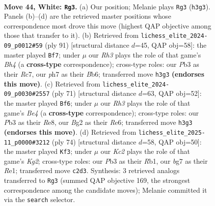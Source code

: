 \documentclass[11pt]{article}
\begin{document}
\clearpage

\begin{figure}[p]\centering
\begin{subfigure}{0.46\textwidth}\centering
\resizebox{\linewidth}{!}{%
\newchessgame
\chessboard[
  setfen={1rr5/1n4bp/p2p2k1/P3p1Pp/1pP1P3/1P3P1R/2K3B1/R3B3 w - - 2 44},
  showmover=false,
  pgfstyle=straightmove, color=movearrow, markmove={h3-g3}
]}
\caption{}
\end{subfigure}\hfill
\begin{subfigure}{0.46\textwidth}\centering
\resizebox{\linewidth}{!}{%
\newchessgame
\chessboard[
  setfen={8/2r3pk/1bp1Bp2/p3pPpb/1r2P3/1P1P2KP/R1R1N1P1/8 b - - 9 46},
  showmover=false,
  pgfstyle=straightmove, color=movearrow, markmove={h5-f7}
]}
\caption{}
\end{subfigure}
\\[4pt]
\begin{subfigure}{0.46\textwidth}\centering
\resizebox{\linewidth}{!}{%
\newchessgame
\chessboard[
  setfen={4r3/3R2pk/2p1r3/p1B1bp2/P3p1p1/2P3P1/1P1R1PB1/6K1 b - - 1 36},
  showmover=false,
  pgfstyle=straightmove, color=movearrow, markmove={e5-f6}
]}
\caption{}
\end{subfigure}\hfill
\begin{subfigure}{0.46\textwidth}\centering
\resizebox{\linewidth}{!}{%
\newchessgame
\chessboard[
  setfen={8/1r1r2p1/p2bkp1p/4p2P/PPp2P2/2B3P1/2P3K1/1R2R3 w - - 1 38},
  showmover=false,
  pgfstyle=straightmove, color=movearrow, markmove={g2-f3}
]}
\caption{}
\end{subfigure}
\caption{\textbf{Move 44, White: \texttt{Rg3}.} (a) Our position; Melanie plays \texttt{Rg3} (\texttt{h3g3}). Panels (b)--(d) are the retrieved master positions whose correspondence most drove this move (highest QAP objective among those that transfer to it). (b) Retrieved from \texttt{lichess\_elite\_2024-09\_p0012\#59} (ply 91) [structural distance $d$=45, QAP obj=58]: the master played \texttt{Bf7}; under $\mu$ our \emph{Rh3} plays the role of that game's \emph{Bh4} (a \textbf{cross-type} correspondence); cross-type roles: our \emph{P}b3 as their \emph{R}c7, our \emph{p}h7 as their \emph{B}b6; transferred move \texttt{h3g3} \textbf{(endorses this move)}. (c) Retrieved from \texttt{lichess\_elite\_2024-09\_p0030\#2557} (ply 71) [structural distance $d$=63, QAP obj=52]: the master played \texttt{Bf6}; under $\mu$ our \emph{Rh3} plays the role of that game's \emph{Be4} (a \textbf{cross-type} correspondence); cross-type roles: our \emph{P}b3 as their \emph{R}e8, our \emph{B}g2 as their \emph{R}e6; transferred move \texttt{h3g3} \textbf{(endorses this move)}. (d) Retrieved from \texttt{lichess\_elite\_2025-11\_p0000\#3212} (ply 74) [structural distance $d$=58, QAP obj=50]: the master played \texttt{Kf3}; under $\mu$ our \emph{Kc2} plays the role of that game's \emph{Kg2}; cross-type roles: our \emph{P}b3 as their \emph{R}b1, our \emph{b}g7 as their \emph{R}e1; transferred move \texttt{c2d3}. Synthesis: 3 retrieved analogs transferred to \texttt{Rg3} (summed QAP objective 169, the strongest correspondence among the candidate moves); Melanie committed it via the \texttt{search} selector.}
\label{fig:thought-m86}
\end{figure}
\end{document}
